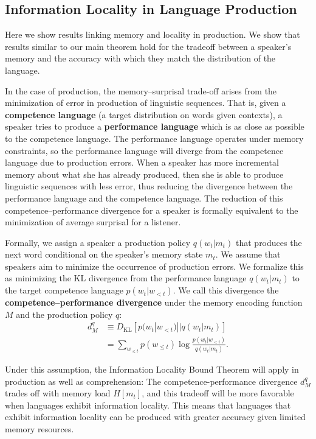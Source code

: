 \documentclass[11pt,letterpaper]{article}
\newcommand{\key}[1]{\textbf{#1}}
\newcounter{theorem}
\begin{document}
\subsection{Information Locality in Language Production}

Here we show results linking memory and locality in production.
We show that results similar to our main theorem hold for the tradeoff between a speaker's memory and the accuracy with which they match the distribution of the language.

In the case of production, the memory--surprisal trade-off arises from the minimization of error in production of linguistic sequences. That is, given a \key{competence language} (a target distribution on words given contexts), a speaker tries to produce a \key{performance language} which is as close as possible to the competence language. The performance language operates under memory constraints, so the performance language will diverge from the competence language due to production errors. When a speaker has more incremental memory about what she has already produced, then she is able to produce linguistic sequences with less error, thus reducing the divergence between the performance language and the competence language. The reduction of this competence--performance divergence for a speaker is formally equivalent to the minimization of average surprisal for a listener.


Formally, we assign a speaker a production policy $q(w_t|m_t)$ that produces the next word conditional on the speaker's memory state $m_t$. 
We assume that speakers aim to minimize the occurrence of production errors.
We formalize this as minimizing the KL divergence from the performance language $q(w_t|m_t)$ to the target competence language $p(w_t|w_{<t})$. We call this divergence the \key{competence--performance divergence} under the memory encoding function $M$ and the production policy $q$:
    \begin{align}
    \label{eq:comp-perf-div}
    d^q_M &\equiv D_{\text{KL}} [ p(w_t|w_{<t}) || q(w_t|m_t) ] \\
        &= \sum_{w_{\le t}} p(w_{\le t}) \log \frac{p(w_t | w_{<t})}{q(w_t|m_t)}.
    \end{align}

Under this assumption, the Information Locality Bound Theorem will apply in production as well as comprehension:
The competence-performance divergence $d_M^q$ trades off with memory load $H[m_t]$, and this tradeoff will be more favorable when languages exhibit information locality.
This means that languages that exhibit information locality can be produced with greater accuracy given limited memory resources.
\end{document}

